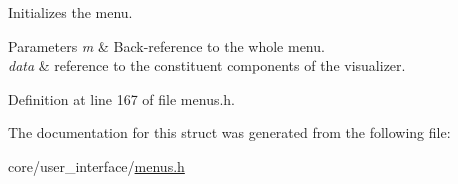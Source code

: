 Initializes the menu. 


\begin{DoxyParams}{Parameters}
{\em m} & Back-\/reference to the whole menu. \\
\hline
{\em data} & reference to the constituent components of the visualizer. \\
\hline
\end{DoxyParams}


Definition at line 167 of file menus.\+h.



The documentation for this struct was generated from the following file\+:\begin{DoxyCompactItemize}
\item 
core/user\+\_\+interface/\hyperlink{menus_8h}{menus.\+h}\end{DoxyCompactItemize}
